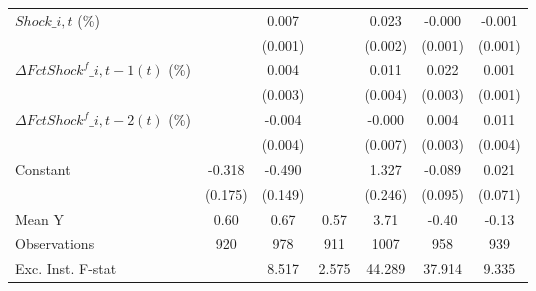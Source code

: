 {\begin{tabular}{l*{6}{c}}
\addlinespace
$ Shock\_{i,t}$ (\%) &                     &       0.007\sym{***}&                     &       0.023\sym{***}&      -0.000         &      -0.001         \\
                    &                     &     (0.001)         &                     &     (0.002)         &     (0.001)         &     (0.001)         \\
\addlinespace
$ \Delta FctShock^f\_{i,t-1}(t)$ (\%)&                     &       0.004         &                     &       0.011\sym{***}&       0.022\sym{***}&       0.001         \\
                    &                     &     (0.003)         &                     &     (0.004)         &     (0.003)         &     (0.001)         \\
\addlinespace
$ \Delta FctShock^f\_{i,t-2}(t)$ (\%)&                     &      -0.004         &                     &      -0.000         &       0.004         &       0.011\sym{***}\\
                    &                     &     (0.004)         &                     &     (0.007)         &     (0.003)         &     (0.004)         \\
\addlinespace
Constant            &      -0.318\sym{*}  &      -0.490\sym{***}&                     &       1.327\sym{***}&      -0.089         &       0.021         \\
                    &     (0.175)         &     (0.149)         &                     &     (0.246)         &     (0.095)         &     (0.071)         \\
\midrule
Mean Y              &        0.60         &        0.67         &        0.57         &        3.71         &       -0.40         &       -0.13         \\
Observations        &         920         &         978         &         911         &        1007         &         958         &         939         \\
Exc. Inst. F-stat   &                     &       8.517         &       2.575         &      44.289         &      37.914         &       9.335         \\
\bottomrule
\end{tabular}
}
